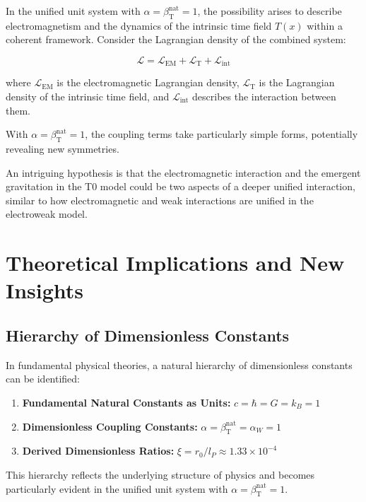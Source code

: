 \documentclass[12pt,a4paper]{article}
\newcommand{\Tfield}{T(x)}
\newcommand{\betaT}{\beta_{\text{T}}}
\begin{document}
	In the unified unit system with \(\alpha = \betaT^{\text{nat}} = 1\), the possibility arises to describe electromagnetism and the dynamics of the intrinsic time field \(\Tfield\) within a coherent framework. Consider the Lagrangian density of the combined system:
	
	\begin{equation}
		\mathcal{L} = \mathcal{L}_{\text{EM}} + \mathcal{L}_{\text{T}} + \mathcal{L}_{\text{int}}
	\end{equation}
	
	where \(\mathcal{L}_{\text{EM}}\) is the electromagnetic Lagrangian density, \(\mathcal{L}_{\text{T}}\) is the Lagrangian density of the intrinsic time field, and \(\mathcal{L}_{\text{int}}\) describes the interaction between them.
	
	With \(\alpha = \betaT^{\text{nat}} = 1\), the coupling terms take particularly simple forms, potentially revealing new symmetries.
	
	An intriguing hypothesis is that the electromagnetic interaction and the emergent gravitation in the T0 model could be two aspects of a deeper unified interaction, similar to how electromagnetic and weak interactions are unified in the electroweak model.
	
	\section{Theoretical Implications and New Insights}
	
	\subsection{Hierarchy of Dimensionless Constants}
	
	In fundamental physical theories, a natural hierarchy of dimensionless constants can be identified:
	
	\begin{enumerate}[label=\arabic*.]
		\item \textbf{Fundamental Natural Constants as Units:} \(c = \hbar = G = k_B = 1\)
		\item \textbf{Dimensionless Coupling Constants:} \(\alpha = \betaT^{\text{nat}} = \alpha_W = 1\)
		\item \textbf{Derived Dimensionless Ratios:} \(\xi = r_0/l_P \approx 1.33 \times 10^{-4}\)
	\end{enumerate}
	
	This hierarchy reflects the underlying structure of physics and becomes particularly evident in the unified unit system with \(\alpha = \betaT^{\text{nat}} = 1\).
	
\end{document}
